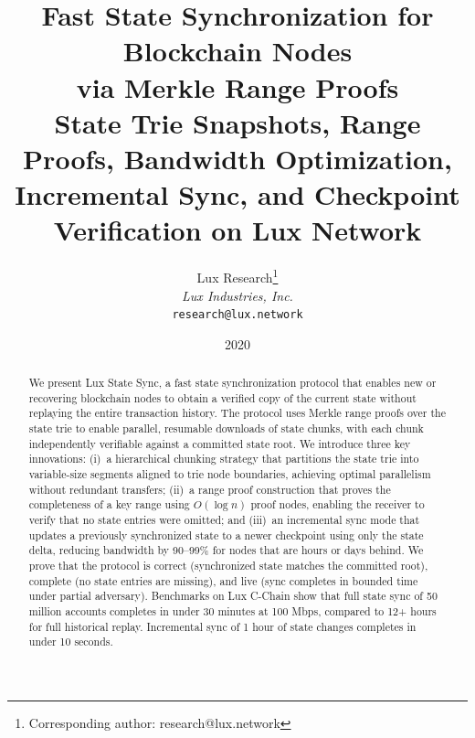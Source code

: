 \documentclass[11pt,a4paper]{article}
\title{\textbf{Fast State Synchronization for Blockchain Nodes\\via Merkle Range Proofs}\\[6pt]
\large State Trie Snapshots, Range Proofs, Bandwidth Optimization,\\Incremental Sync, and Checkpoint Verification on Lux Network}
\author{
Lux Research\thanks{Corresponding author: research@lux.network}\\
\textit{Lux Industries, Inc.}\\
\texttt{research@lux.network}
}
\date{2020}
\begin{document}
\luxcoverpage

\begin{abstract}
We present Lux State Sync, a fast state synchronization protocol that enables new or recovering blockchain nodes to obtain a verified copy of the current state without replaying the entire transaction history. The protocol uses Merkle range proofs over the state trie to enable parallel, resumable downloads of state chunks, with each chunk independently verifiable against a committed state root. We introduce three key innovations: (i)~a hierarchical chunking strategy that partitions the state trie into variable-size segments aligned to trie node boundaries, achieving optimal parallelism without redundant transfers; (ii)~a range proof construction that proves the completeness of a key range using $O(\log n)$ proof nodes, enabling the receiver to verify that no state entries were omitted; and (iii)~an incremental sync mode that updates a previously synchronized state to a newer checkpoint using only the state delta, reducing bandwidth by 90--99\% for nodes that are hours or days behind. We prove that the protocol is correct (synchronized state matches the committed root), complete (no state entries are missing), and live (sync completes in bounded time under partial adversary). Benchmarks on Lux C-Chain show that full state sync of 50 million accounts completes in under 30 minutes at 100 Mbps, compared to 12+ hours for full historical replay. Incremental sync of 1 hour of state changes completes in under 10 seconds.
\end{abstract}

















\end{document}
